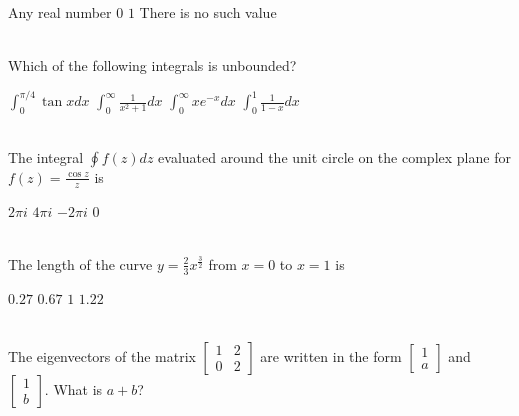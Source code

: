 \documentclass[addpoints,11pt]{exam}
\begin{document}
\begin{questions}
        \begin{oneparchoices}
            \choice Any real number
            \choice $0$
            \choice $1$
            \choice There is no such value
        \end{oneparchoices}\\
        \question Which of the following integrals is unbounded?\\

        \begin{oneparchoices}
            \choice $\int_{0}^{\pi/4}{\tan x dx}$
            \choice $\int_{0}^{\infty}{\frac{1}{x^2+1} dx}$
            \choice $\int_{0}^{\infty}{xe^{-x} dx}$
            \choice $\int_{0}^{1}{\frac{1}{1-x} dx}$
        \end{oneparchoices}\\

        \question The integral $\oint{f(z)dz}$ evaluated around the unit circle on the complex plane for $f(z) = \frac{\cos z}{z}$ is\\

        \begin{oneparchoices}
            \choice $2\pi i$
            \choice $4\pi i$
            \choice $-2\pi i$
            \choice $0$
        \end{oneparchoices}\\

        \question The length of the curve $y=\frac{2}{3}x^{\frac{3}{2}}$ from $x=0$ to $x=1$ is\\

        \begin{oneparchoices}
            \choice $0.27$
            \choice $0.67$
            \choice $1$
            \choice $1.22$
        \end{oneparchoices}\\

        \question The eigenvectors of the matrix $\begin{bmatrix}
        1 & 2 \\
        0 & 2
    \end{bmatrix}$ are written in the form $\begin{bmatrix}
        1 \\
        a
    \end{bmatrix}$ and $\begin{bmatrix}
        1 \\b
    \end{bmatrix}$. What is $a+b$?


\end{questions}
\end{document}
